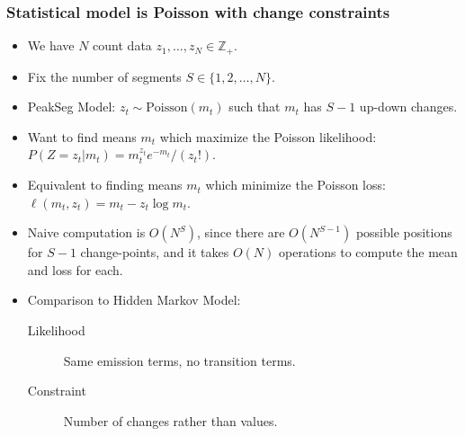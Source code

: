 \documentclass{beamer}
\newcommand{\ZZ}{\mathbb Z}
\begin{document}
\begin{frame}
  \frametitle{Statistical model is Poisson with change constraints}
  \begin{itemize}
  \item We have $N$ count data $z_1, \dots, z_N\in\ZZ_+$.
  \item Fix the number of segments $S\in\{1, 2, \dots, N\}$.
  \item PeakSeg Model: $z_t \sim \text{Poisson}(m_t)$ such that $m_t$
    has $S-1$ up-down changes.
  \item Want to find means $m_t$ which maximize the Poisson likelihood:
    $P(Z = z_t|m_t) = m_t^{z_t} e^{-m_t} / (z_t!)$.
  \item Equivalent to finding means $m_t$ which minimize the Poisson
    loss: $\ell(m_t, z_t) = m_t - z_t\log m_t$.
  \item Naive computation is $O(N^S)$, since there are $O(N^{S-1})$ possible
    positions for $S-1$ change-points, and it takes $O(N)$ operations to
    compute the mean and loss for each.
  \item Comparison to Hidden Markov Model:
    \begin{description}
    \item[Likelihood] Same emission terms, no transition terms.
    \item[Constraint] Number of changes rather than values.
    \end{description}
  \end{itemize}
\end{frame}
\end{document}
